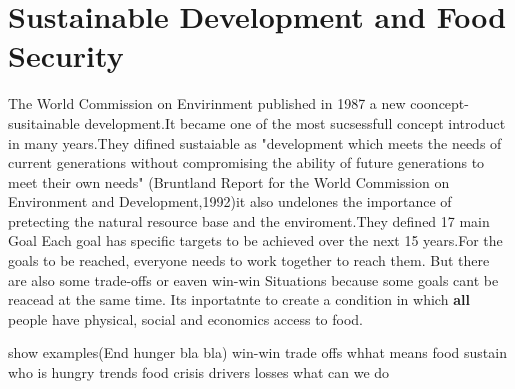 \section{Sustainable Development
	and Food Security}

The World Commission on Envirinment published in 1987 a new cooncept-susitainable development.It became one of the most sucsessfull concept introduct in many years.They difined sustaiable as "development which meets the needs of current generations without compromising the ability of future generations to meet their own needs" (Bruntland Report for the World Commission on Environment and Development,1992)it also undelones the importance of pretecting the natural resource base and the enviroment.They defined 17 main Goal Each goal has specific targets to be achieved over the next 15 years.For the goals to be reached, everyone needs to work together to reach them.%
But there are also some trade-offs or eaven win-win Situations  because some goals cant be reacead at the same time.
Its inportatnte to create a condition in which \textbf{all} people have physical, social and economics access to food.




show examples(End hunger bla bla)
win-win trade offs
whhat means food sustain
who is hungry
trends
food crisis
drivers
losses
what can we do